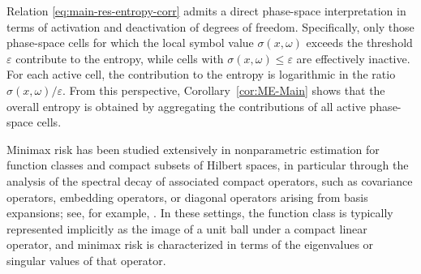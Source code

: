 \documentclass[a4paper,12pt]{article}
\let\originalleft\left
\let\originalright\right
\renewcommand{\left}{\mathopen{}\mathclose\bgroup\originalleft}
\renewcommand{\right}{\aftergroup\egroup\originalright}
\newcommand{\N}{\mathbb{N}}
\begin{document}
Relation \eqref{eq:main-res-entropy-corr} admits a direct phase-space
interpretation in terms of activation and deactivation of degrees of freedom.
Specifically, only those phase-space cells for which the local symbol value
$\sigma(x,\omega)$ exceeds the threshold $\varepsilon$ contribute to the entropy,
while cells with $\sigma(x,\omega)\le\varepsilon$ are effectively inactive.
For each active cell, the contribution to the entropy is logarithmic in the
ratio $\sigma(x,\omega)/\varepsilon$. From this perspective, Corollary~\ref{cor:ME-Main} shows that the overall entropy is
obtained by aggregating the contributions of all active phase-space cells.


Minimax risk has been studied extensively in nonparametric estimation for function
classes and compact subsets of Hilbert spaces, in particular through the analysis
of the spectral decay of associated compact operators, such as covariance
operators, embedding operators, or diagonal operators arising from basis
expansions; see, for example,
\cite{ibragimov1981statistical,pinsker1980optimal,tsybakovIntroductionNonparametricEstimation2009}.
In these settings, the function class is typically represented implicitly as the
image of a unit ball under a compact linear operator, and minimax risk is
characterized in terms of the eigenvalues or singular values of that operator.
\end{document}

